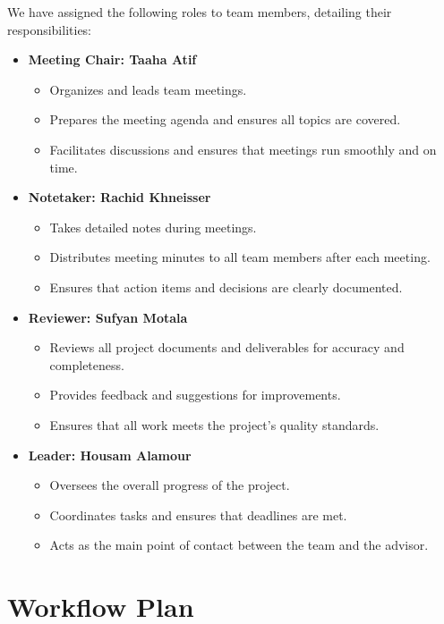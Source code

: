 \documentclass{article}
\begin{document}
We have assigned the following roles to team members, detailing their responsibilities:

\begin{itemize}
    \item \textbf{Meeting Chair: Taaha Atif}
    \begin{itemize}
        \item Organizes and leads team meetings.
        \item Prepares the meeting agenda and ensures all topics are covered.
        \item Facilitates discussions and ensures that meetings run smoothly and on time.
    \end{itemize}

    \item \textbf{Notetaker: Rachid Khneisser}
    \begin{itemize}
        \item Takes detailed notes during meetings.
        \item Distributes meeting minutes to all team members after each meeting.
        \item Ensures that action items and decisions are clearly documented.
    \end{itemize}

    \item \textbf{Reviewer: Sufyan Motala}
    \begin{itemize}
        \item Reviews all project documents and deliverables for accuracy and completeness.
        \item Provides feedback and suggestions for improvements.
        \item Ensures that all work meets the project’s quality standards.
    \end{itemize}

    \item \textbf{Leader: Housam Alamour}
    \begin{itemize}
        \item Oversees the overall progress of the project.
        \item Coordinates tasks and ensures that deadlines are met.
        \item Acts as the main point of contact between the team and the advisor.
    \end{itemize}
\end{itemize}


\section{Workflow Plan}
\end{document}
